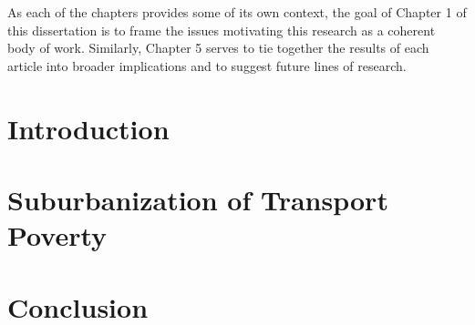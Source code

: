 \documentclass[11 pt, letterpaper]{report}
\begin{document}
As each of the chapters provides some of its own context, the goal of Chapter 1 of this dissertation is to frame the issues motivating this research as a coherent body of work. Similarly, Chapter 5 serves to tie together the results of each article into broader implications and to suggest future lines of research. 



\newpage


\renewcommand{\thepage}{\arabic{page}}%
\setcounter{page}{1}


\chapter{{Introduction}}





\chapter{Suburbanization of Transport Poverty}




\chapter{Conclusion}







\newpage





%
%
%
%
\end{document}
